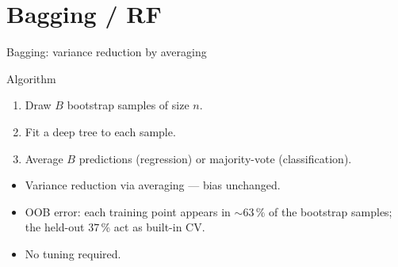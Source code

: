 \documentclass[aspectratio=169,11pt]{beamer}
\begin{document}
\section{Bagging / RF}

\begin{frame}{Bagging: variance reduction by averaging}
  \begin{block}{Algorithm}
    \begin{enumerate}
      \item Draw $B$ bootstrap samples of size $n$.
      \item Fit a deep tree to each sample.
      \item Average $B$ predictions (regression) or majority-vote
            (classification).
    \end{enumerate}
  \end{block}
  \begin{takeaway}
    \begin{itemize}
      \item Variance reduction via averaging --- bias unchanged.
      \item OOB error: each training point appears in $\sim 63\,\%$
            of the bootstrap samples; the held-out $37\,\%$ act as
            built-in CV.
      \item No tuning required.
    \end{itemize}
  \end{takeaway}
\end{frame}
\end{document}
